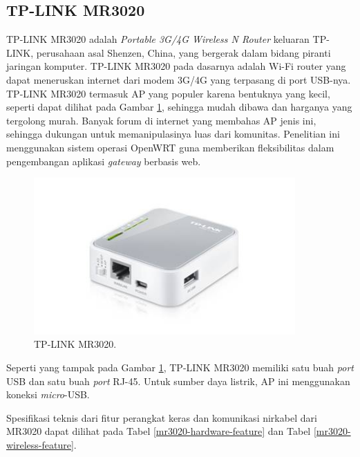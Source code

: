   \subsection{TP-LINK MR3020}
    TP-LINK MR3020 adalah \emph{Portable 3G/4G Wireless N Router} keluaran TP-LINK, perusahaan asal Shenzen, China, yang bergerak dalam bidang piranti jaringan komputer. TP-LINK MR3020 pada dasarnya adalah Wi-Fi router yang dapat meneruskan internet dari modem 3G/4G yang terpasang di port USB-nya. TP-LINK MR3020 termasuk AP yang populer karena bentuknya yang kecil, seperti dapat dilihat pada Gambar \ref{mr3020}, sehingga mudah dibawa dan harganya yang tergolong murah. Banyak forum di internet yang membahas AP jenis ini, sehingga dukungan untuk memanipulasinya luas dari komunitas. Penelitian ini menggunakan sistem operasi OpenWRT guna memberikan fleksibilitas dalam pengembangan aplikasi \emph{gateway} berbasis web.

    \begin{figure}[H]
      \centering
        \includegraphics[width=10cm]{gambar/mr3020}
        \caption{TP-LINK MR3020.}
        \label{mr3020}
    \end{figure}

    Seperti yang tampak pada Gambar \ref{mr3020}, TP-LINK MR3020 memiliki satu buah \emph{port} USB dan satu buah \emph{port} RJ-45. Untuk sumber daya listrik, AP ini menggunakan koneksi \emph{micro}-USB.

    Spesifikasi teknis dari fitur perangkat keras dan komunikasi nirkabel dari MR3020 dapat dilihat pada Tabel \ref{mr3020-hardware-feature} dan Tabel \ref{mr3020-wireless-feature}.

